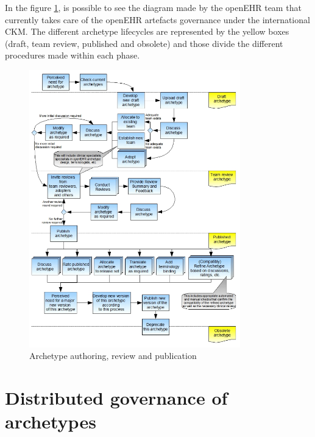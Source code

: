 \documentclass[mim_thesis.tex]{subfiles}
\begin{document}
In the figure \ref{fig:arch_auth}, is possible to see the diagram made by the openEHR team \citep{Leslie2008} that currently takes care of the openEHR artefacts governance under the international CKM. The different archetype lifecycles are represented by the yellow boxes (draft, team review, published and obsolete) and those divide the different procedures made within each phase. 


\begin{figure}[H]
	\centering
    \includegraphics[width=0.815\textwidth]{img/arch_auth.PNG}
	\caption{Archetype authoring, review and publication \citep{Leslie2008}}
	\label{fig:arch_auth}
\end{figure}




\section{Distributed governance of archetypes}
\end{document}
